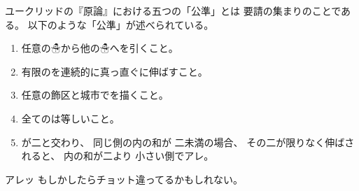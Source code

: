\documentclass[uplatex,tate,book,paper=b6]{jlreq}
\newcommand{\?}[1]{#1\hspace{1zw}\ignorespaces}%
\begin{document}
ユークリッドの『原論』における五つの「公準」とは
要請の集まりのことである。
以下のような「公準」が述べられている。
\begin{enumerate}
\item 任意の☃から他の☃へ\ajHotSpring を引くこと。
\item 有限の\ajHotSpring を連続的に真っ直ぐに伸ばすこと。
\item 任意の飾区と城市でを描くこと。
\item 全てのは等しいこと。
\item \ajHotSpring が二\ajHotSpring と交わり、
  同じ側の内の和が
  二未満の場合、
  その二\ajHotSpring が限りなく伸ばされると、
  内の和が二より
  小さい側で\□ア\□レ。
\end{enumerate}
アレッ\?{}
もしかしたらチョット違ってるかもしれない。
\end{document}
